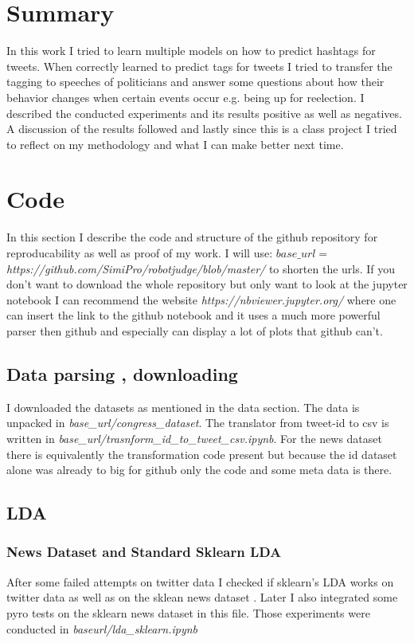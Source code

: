 \documentclass[10pt,conference,compsocconf]{IEEEtran}
\begin{document}
\section{Summary}
\label{sec:Summary}
In this work I tried to learn multiple models on how to predict hashtags for tweets. When correctly learned to predict tags for tweets I tried to transfer the tagging to speeches of politicians and answer some questions about how their behavior changes when certain events occur e.g. being up for reelection. I described the conducted experiments and its results positive as well as negatives. A discussion of the results followed and lastly since this is a class project I tried to reflect on my methodology and what I can make better next time. 

\section{Code}
\label{sec:Code}
In this section I describe the code and structure of the github repository for reproducability as well as proof of my work. I will use: $base\_url =$ \textit{https://github.com/SimiPro/robotjudge/blob/master/} to shorten the urls. If you don't want to download the whole repository but only want to look at the jupyter notebook I can recommend the website \textit{https://nbviewer.jupyter.org/} where one can insert the link to the github notebook and it uses a much more powerful parser then github and especially can display a lot of plots that github can't.

\subsection{Data parsing , downloading}
I downloaded the datasets as mentioned in the data section. The data is unpacked in \textit{base\_url/congress\_dataset}. The translator from tweet-id to csv is written in \textit{base\_url/trasnform\_id\_to\_tweet\_csv.ipynb}. For the news dataset there is equivalently the transformation code present but because the id dataset alone was already to big for github only the code and some meta data is there. 

\subsection{LDA}
\subsubsection{News Dataset and Standard Sklearn LDA}
After some failed attempts on twitter data I checked if sklearn's LDA works on twitter data as well as on the sklean news dataset \cite{sklearn_newsdataset}. Later I also integrated some pyro tests on the sklearn news dataset in this file. Those experiments were conducted in \textit{baseurl/lda\_sklearn.ipynb}
\end{document}
